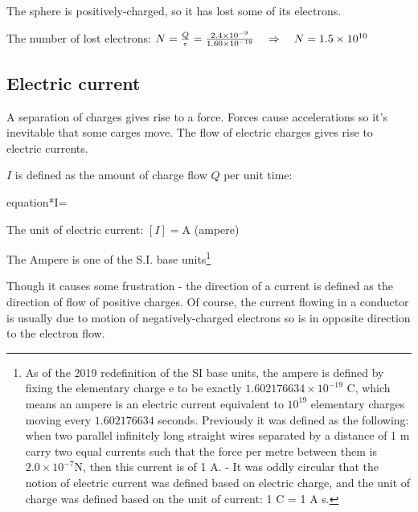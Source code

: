 
\begin{soln} The sphere is positively-charged, so it has lost some of its electrons.

The number of lost electrons: $ N = \frac{Q}{e} = \frac{2.4\times10^{-9}}{1.60 \times10^{-19}} \quad \Rightarrow \quad N = 1.5 \times 10^{10}  $ \end{soln}



\subsection{Electric current}

A separation of charges gives rise to a force. Forces cause accelerations so it's inevitable that some carges move. The flow of electric charges gives rise to electric currents.

\begin{ilight}
	\centering {} $I$ is defined as the amount of charge flow $Q$ per unit time: \begin{empheq}[box=\tcbhighmath]{equation*}{I=}\end{empheq}
\end{ilight}


\cmt The unit of electric current: $[I] = \text{A}$ (ampere)

The Ampere is one of the S.I. base units\footnote{As of the 2019 redefinition of the SI base units, the ampere is defined by fixing the elementary charge e to be exactly $1.602176634 \times 10^{-19}$ C, which means an ampere is an electric current equivalent to $10^{19}$ elementary charges moving every $1.602176634$ seconds. Previously it was defined as the following: when two parallel infinitely long straight wires separated by a distance of 1 m carry two equal currents such that the force per metre between them is $2.0\times10^{-7}$N, then this current is of 1 A. - It was oddly circular that the notion of electric current was defined based on electric charge, and the unit of charge was defined based on the unit of current: 1 C = 1 A s.}

Though it causes some frustration - the direction of a current is defined as the direction of flow of positive charges. Of course, the current flowing in a conductor is usually due to motion of negatively-charged electrons so  is in opposite direction to the electron flow. 

